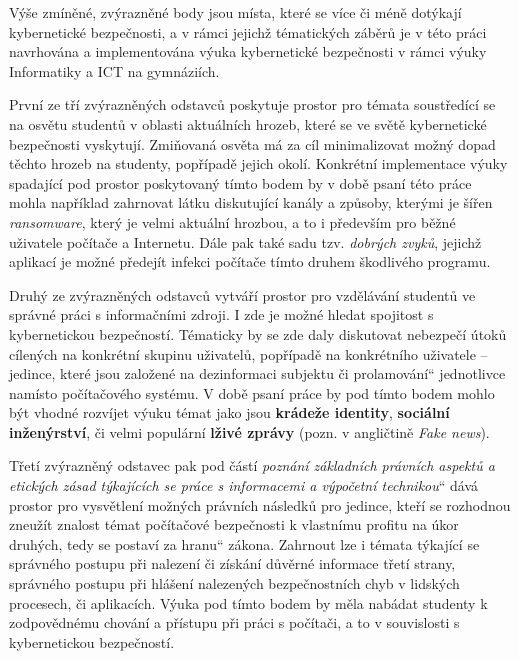 \documentclass[a4paper, 12pt]{article}
\providecommand{\uv}[1]{\quotedblbase #1\textquotedblleft}
\begin{document}
Výše zmíněné, zvýrazněné body jsou místa, které se více či méně dotýkají kybernetické bezpečnosti, a v rámci jejichž tématických záběrů je v této práci navrhována a implementována výuka kybernetické bezpečnosti v rámci výuky Informatiky a ICT na gymnáziích.
 
První ze tří zvýrazněných odstavců poskytuje prostor pro témata soustředící se na osvětu studentů v oblasti aktuálních hrozeb, které se ve světě kybernetické bezpečnosti vyskytují. Zmiňovaná osvěta má za cíl minimalizovat možný dopad těchto hrozeb na studenty, popřípadě jejich okolí. Konkrétní implementace výuky spadající pod prostor poskytovaný tímto bodem by v době psaní této práce mohla například zahrnovat látku diskutující kanály a způsoby, kterými je šířen \textit{ransomware}, který je velmi aktuální hrozbou, a to i především pro běžné uživatele počítače a Internetu. Dále pak také sadu tzv. \textit{dobrých zvyků}, jejichž aplikací je možné předejít infekci počítače tímto druhem škodlivého programu.

Druhý ze zvýrazněných odstavců vytváří prostor pro vzdělávání studentů ve správné práci s informačními zdroji. I zde je možné hledat spojitost s kybernetickou bezpečností. Tématicky by se zde daly diskutovat nebezpečí útoků cílených na konkrétní skupinu uživatelů, popřípadě na konkrétního uživatele -- jedince, které jsou založené na dezinformaci subjektu či \uv{prolamování} jednotlivce namísto počítačového systému. V době psaní práce by pod tímto bodem mohlo být vhodné rozvíjet výuku témat jako jsou \textbf{krádeže identity}, \textbf{sociální inženýrství}, či velmi populární \textbf{lživé zprávy} (pozn. v angličtině \textit{Fake news}).

Třetí zvýrazněný odstavec pak pod částí \uv{\textit{poznání základních právních aspektů a etických zásad týkajících se práce s informacemi a výpočetní technikou}} dává prostor pro vysvětlení možných právních následků pro jedince, kteří se rozhodnou zneužít znalost témat počítačové bezpečnosti k vlastnímu profitu na úkor druhých, tedy se postaví za \uv{hranu} zákona. Zahrnout lze i témata týkající se správného postupu při nalezení či získání důvěrné informace třetí strany, správného postupu při hlášení nalezených bezpečnostních chyb v lidských procesech, či aplikacích. Výuka pod tímto bodem by měla nabádat studenty k zodpovědnému chování a přístupu při práci s počítači, a to v souvislosti s kybernetickou bezpečností.
\end{document}
